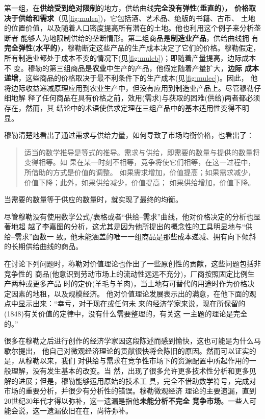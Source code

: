第一组，在\textbf{供给受到绝对限制}的地方，供给曲线\textbf{完全没有弹性(垂直的)，
  价格取决于供给和需求}（见\cref{fig:mulea})，它包括酒、艺术品、绝版的书籍、古币、
土地的位置价值，以及随着人口密度提高所有潜在的土地。他也利用这个例子来分析垄断者
能够人为地限制供给的垄断情形。第二组商品是\textbf{制造业产品}，供给曲线拥
有\textbf{完全弹性(水平的)}，穆勒断定这些产品的生产成本决定了它们的价格。穆勒假定，
所有制造业都处于成本不变的情况下(见\cref{fig:muleb})；即随着产量提高，边际成本不
变。穆勒的第三组商品是\textbf{农业}中生产的产品，他假定随着产量扩大，\textbf{边际
  成本递增}，这些商品的价格取决于最不利条件下的生产成本(见\cref{fig:mulec})。因此，
他将边际收益递减原理应用到农业生产中，但没有应用到制造业产品上。尽管穆勒仔细地解
释了任何商品在具有价格之前，效用(需求)与获取的困难(供给)两者都必须存在，然而，其
结论中的术语使供求定理在三组产品中的基本适用性变得不明显。

穆勒清楚地看出了通过需求与供给力量，如何导致了市场均衡价格，也看出了：
\begin{quotation}
  适当的数学推导是等式的推导。需求与供给，即需要的数量与提供的数量将变得相等。如
  果在某一时刻不相等，竞争将使它们相等，在这一过程中，所借助的方式是价值的调整。
  如果需求增加，价值提高；如果需求减少，价值下降；此外，如果供给减少，价值提高；
  如果供给增加，价值下降。
\end{quotation}

当需要的数量等于供应的数量时，就实现了最终的均衡。

尽管穆勒没有使用数学公式/表格或者“供给--需求”曲线，他对价格决定的分析也显著地超
越了李嘉图的分析，这尤其是因为他所提出的概念性的工具明显地与“供给--需求”函数一
致。他未能涵盖的唯一一组商品是那些成本递减、拥有向下倾斜的长期供给曲线的商品。

在讨论下列问题时，称勒对价值理论也作出了一些原创性的贡献，这些问题包括非竞争性的
商品(他意识到劳动市场上的流动性远远不充分)，厂商按照固定比例生产两种或更多产品
时的定价(羊毛与羊肉)，当土地有可替代的用途时作为价格决定因素的地租，以及规模经济。
他对价值理论发展表示出的满意，在他下面的观点中显示出来：“幸亏，对于现在或任何未
来的经济学家来说，现在所保留的(1848)有关价值的定律中，没有什么需要整理的，有关这
一主题的理论是完全的。”

很多在穆勒之后进行创作的经济学家因这段陈述而感到愉快，这也可能是为什么马歇尔提出，
他自己对微观经济理论的贡献很快将会陈旧的原因。然而可以证实的是，从穆勒以来，我们
对供给与需求在竞争性市场下的资源配置中所起作用的一般理解，没有发生基本的改变。当
然，出现了很多允许更多技术性分析和更多见解的进展；但是，穆勒能够运用原始的技术工
具，完全不借助数学符号，完成对市场的重要分析，并很少有分析性的错误。穆勒微观经济
理论的主要遗漏，直到20世纪30年代才得以弥补，这一遗漏是指他\textbf{未能分析不完全
  竞争市场}。一些人可能会说，这一遗漏依旧在在，尚待弥补。

